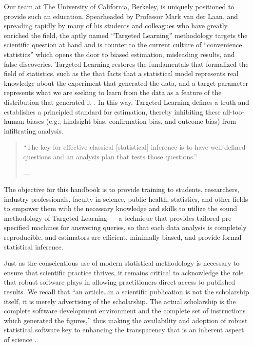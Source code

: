 \documentclass[12pt, krantz2,]{book}
\theoremstyle{definition}
\theoremstyle{definition}
\theoremstyle{definition}
\newcommand{\1}{\mathbbm{1}}
\begin{document}
Our team at The University of California, Berkeley, is uniquely positioned to
provide such an education. Spearheaded by Professor Mark van der Laan, and
spreading rapidly by many of his students and colleagues who have greatly
enriched the field, the aptly named ``Targeted Learning'' methodology targets the
scientific question at hand and is counter to the current culture of
``convenience statistics'' which opens the door to biased estimation, misleading
results, and false discoveries. Targeted Learning restores the fundamentals that
formalized the field of statistics, such as the that facts that a statistical
model represents real knowledge about the experiment that generated the data,
and a target parameter represents what we are seeking to learn from the data as
a feature of the distribution that generated it \citep{vdl2014entering}. In this way,
Targeted Learning defines a truth and establishes a principled standard for
estimation, thereby inhibiting these all-too-human biases (e.g., hindsight bias,
confirmation bias, and outcome bias) from infiltrating analysis.

\begin{quote}
``The key for effective classical {[}statistical{]} inference is to have
well-defined questions and an analysis plan that tests those questions.''

--- \citet{nosek2018preregistration}
\end{quote}

The objective for this handbook is to provide training to students, researchers,
industry professionals, faculty in science, public health, statistics, and other
fields to empower them with the necessary knowledge and skills to utilize the
sound methodology of Targeted Learning --- a technique that provides tailored
pre-specified machines for answering queries, so that each data analysis is
completely reproducible, and estimators are efficient, minimally biased, and
provide formal statistical inference.

Just as the conscientious use of modern statistical methodology is necessary to
ensure that scientific practice thrives, it remains critical to acknowledge the
role that robust software plays in allowing practitioners direct access to
published results. We recall that ``an article\ldots{}in a scientific publication is
not the scholarship itself, it is merely advertising of the scholarship. The
actual scholarship is the complete software development environment and the
complete set of instructions which generated the figures,'' thus making the
availability and adoption of robust statistical software key to enhancing the
transparency that is an inherent aspect of science \citep{buckheit1995wavelab}.
\end{document}
